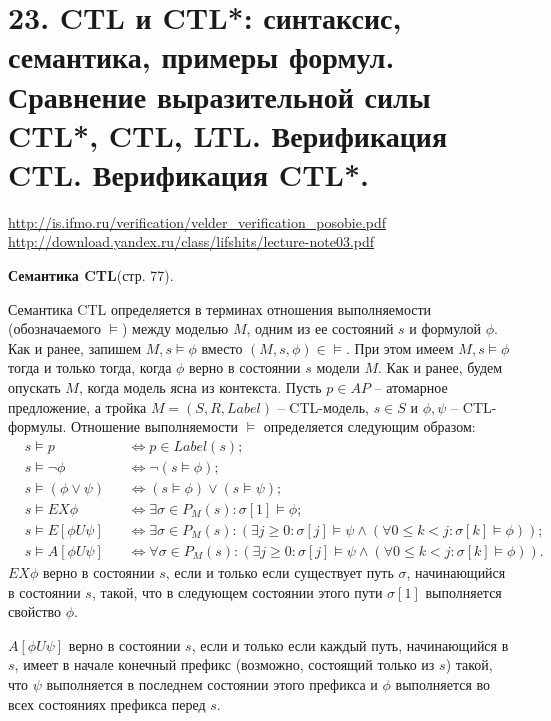 \documentclass[a4paper,12pt]{article}
\begin{document}
\section*{23. CTL и CTL*: синтаксис, семантика, примеры формул. Сравнение выразительной силы CTL*, CTL, LTL. Верификация CTL. Верификация CTL*.}
\url{http://is.ifmo.ru/verification/velder_verification_posobie.pdf}
\url{http://download.yandex.ru/class/lifshits/lecture-note03.pdf}

\textbf{Семантика CTL}(стр. 77).

Семантика CTL определяется в терминах отношения выполняемости
(обозначаемого $\vDash$) между моделью $M$, одним из ее состояний $s$ и
формулой $\phi$. Как и ранее, запишем $M, s\vDash \phi$ вместо $(M, s, \phi) \in \vDash$.
При этом имеем $M, s\vDash \phi$ тогда и только тогда, когда $\phi$ верно в
состоянии $s$ модели $M$. Как и ранее, будем опускать $M$, когда модель
ясна из контекста.
Пусть $p \in AP$ -- атомарное предложение, а тройка $M = (S, R, Label)$ --
CTL-модель, $s \in S$ и $\phi, \psi$ -- CTL-формулы. Отношение выполняемости
$\vDash$ определяется следующим образом:
\begin{align*}
    &s\vDash p &&\Leftrightarrow p \in Label(s);\\
    &s\vDash \lnot \phi &&\Leftrightarrow \lnot(s\vDash \phi);\\
    &s\vDash (\phi \vee \psi) &&\Leftrightarrow (s\vDash \phi) \vee (s \vDash \psi);\\
    &s\vDash EX \phi &&\Leftrightarrow \exists \sigma \in P_M(s): \sigma[1]\vDash \phi;\\
    &s\vDash E[\phi U \psi] &&\Leftrightarrow \exists \sigma \in P_M(s): (\exists j \ge 0: \sigma[j]\vDash \psi \wedge (\forall 0 \le k < j: \sigma[k]\vDash \phi));\\
    &s\vDash A[\phi U \psi] &&\Leftrightarrow \forall \sigma \in P_M(s): (\exists j \ge 0: \sigma[j]\vDash \psi \wedge (\forall 0 \le k < j: \sigma[k]\vDash \phi)).
\end{align*}
$EX \phi$ верно в состоянии $s$, если и только если существует путь $\sigma$,
начинающийся в состоянии $s$, такой, что в следующем состоянии
этого пути $\sigma[1]$ выполняется свойство $\phi$.

$A[\phi U \psi]$ верно в состоянии $s$, если и только если каждый путь,
начинающийся в $s$, имеет в начале конечный префикс (возможно,
состоящий только из $s$) такой, что $\psi$ выполняется в последнем
состоянии этого префикса и $\phi$ выполняется во всех состояниях
префикса перед $s$.
\end{document}
